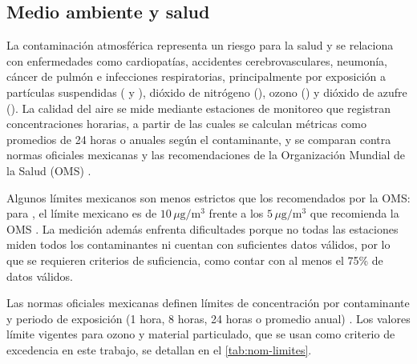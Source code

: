 \subsection{Medio ambiente y salud}
\label{sec:revi-medio-ambiente}

La contaminación atmosférica representa un riesgo para la salud y se
relaciona con enfermedades como cardiopatías, accidentes cerebrovasculares,
neumonía, cáncer de pulmón e infecciones respiratorias, principalmente por
exposición a partículas suspendidas ( y ), dióxido de
nitrógeno (), ozono () y dióxido de azufre (). La
calidad del aire se mide mediante estaciones de monitoreo que registran
concentraciones horarias, a partir de las cuales se calculan métricas como
promedios de 24 horas o anuales según el contaminante, y se comparan contra
normas oficiales mexicanas y las recomendaciones de la Organización Mundial
de la Salud (OMS) \parencite{oms2021}.

Algunos límites mexicanos son menos estrictos que los recomendados por la
OMS: para , el límite mexicano es de
$10\,\mu\mathrm{g}/\mathrm{m}^{3}$ frente a los $5\,\mu\mathrm{g}/\mathrm{m}^{3}$
que recomienda la OMS \parencite{oms2021}. La medición además enfrenta
dificultades porque no todas las estaciones miden todos los contaminantes ni
cuentan con suficientes datos válidos, por lo que se requieren criterios de
suficiencia, como contar con al menos el 75\% de datos válidos.

Las normas oficiales mexicanas definen límites de concentración por
contaminante y periodo de exposición (1 hora, 8 horas, 24 horas o
promedio anual) \parencite{nlAirenlgobmxNormatividad, NOMCalidadAireAmbiente}.
Los valores límite vigentes para ozono y material particulado, que se usan
como criterio de excedencia en este trabajo, se detallan en el
\cref{tab:nom-limites}.
